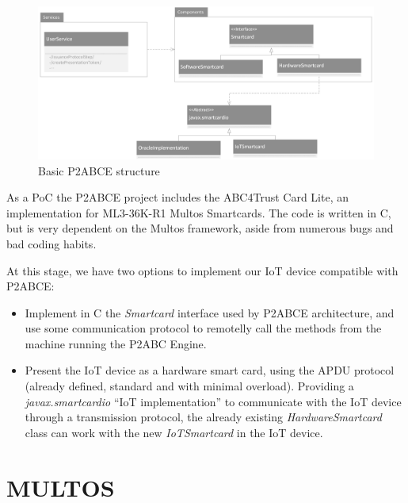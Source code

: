 \begin{figure}[bth]
	\begin{center}
		\includegraphics[width=\linewidth]{gfx/p2abceBasicUML}
	\end{center}
	\caption{Basic P2ABCE structure}
	\label{fig:p2abceBasicUML}
\end{figure}


As a PoC the P2ABCE project includes the ABC4Trust Card Lite, an implementation for ML3-36K-R1 Multos Smartcards. The code is written in C, but is very dependent on the Multos framework, aside from numerous bugs and bad coding habits. 



At this stage, we have two options to implement our IoT device compatible with P2ABCE:

\begin{itemize}
	\item Implement in C the \textit{Smartcard} interface used by P2ABCE architecture, and use some communication protocol to remotelly call the methods from the machine running the P2ABC Engine.
	\item Present the IoT device as a hardware smart card, using the APDU protocol (already defined, standard and with minimal overload). Providing a \textit{javax.smartcardio} ``IoT implementation'' to communicate with the IoT device through a transmission protocol, the already existing \textit{HardwareSmartcard} class can work with the new \textit{IoTSmartcard} in the IoT device.
\end{itemize}






\section{MULTOS}

